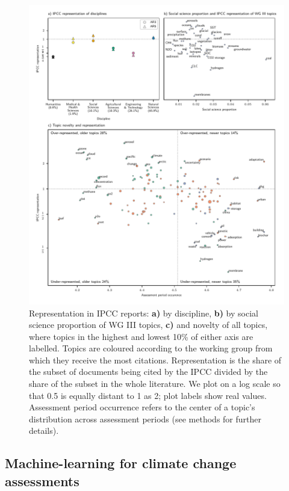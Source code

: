 \documentclass{article}
\begin{document}
\begin{linenumbers}
		\begin{figure}[htp]
			\begin{center}
				\includegraphics[width=180mm]{../plots_pub/big_panel_representation.pdf}
				\caption{Representation in IPCC reports: \textbf{a)} by discipline, \textbf{b)} by social science proportion of WG III topics, \textbf{c)} and novelty of all topics, where topics in the highest and lowest 10\% of either axis are labelled. Topics are coloured according to the working group from which they receive the most citations. Representation is the share of the subset of documents being cited by the IPCC divided by the share of the subset in the whole literature. We plot on a log scale so that 0.5 is equally distant to 1 as 2; plot labels show real values. Assessment period occurrence refers to the center of a topic's distribution across assessment periods (see methods for further details).}
				\label{oecd_rep}
			\end{center}
		\end{figure}
		
		
		\subsection*{Machine-learning for climate change assessments}
		

\end{linenumbers}
\end{document}
